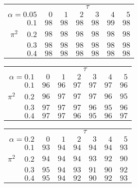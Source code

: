 \begin{tabular}{r|rrrrrr}
\hline\hline
 &\multicolumn{6}{c}{$\tau$} \\ 
 $\alpha = 0.05$ & $0$ & $1$ & $2$ & $3$ & $4$ & $5$ \\ 
 \hline$0.1$ & $98$ & $98$ & $98$ & $98$ & $99$ & $98$\\ 
$\pi^2\;\;\;$ $0.2$ & $98$ & $98$ & $98$ & $98$ & $98$ & $98$\\ 
$0.3$ & $98$ & $98$ & $98$ & $98$ & $98$ & $98$\\ 
$0.4$ & $98$ & $98$ & $98$ & $98$ & $98$ & $98$\\ 
 \hline 
 \end{tabular}
 
 \vspace{2em} 
 
\begin{tabular}{r|rrrrrr}
\hline\hline
 &\multicolumn{6}{c}{$\tau$} \\ 
 $\alpha = 0.1$ & $0$ & $1$ & $2$ & $3$ & $4$ & $5$ \\ 
 \hline$0.1$ & $96$ & $96$ & $97$ & $97$ & $97$ & $96$\\ 
$\pi^2\;\;\;$ $0.2$ & $96$ & $97$ & $97$ & $97$ & $96$ & $95$\\ 
$0.3$ & $97$ & $97$ & $97$ & $96$ & $95$ & $96$\\ 
$0.4$ & $97$ & $97$ & $96$ & $95$ & $96$ & $97$\\ 
 \hline 
 \end{tabular}
 
 \vspace{2em} 
 
\begin{tabular}{r|rrrrrr}
\hline\hline
 &\multicolumn{6}{c}{$\tau$} \\ 
 $\alpha = 0.2$ & $0$ & $1$ & $2$ & $3$ & $4$ & $5$ \\ 
 \hline$0.1$ & $93$ & $94$ & $94$ & $94$ & $94$ & $93$\\ 
$\pi^2\;\;\;$ $0.2$ & $94$ & $94$ & $94$ & $93$ & $92$ & $90$\\ 
$0.3$ & $95$ & $94$ & $93$ & $91$ & $90$ & $92$\\ 
$0.4$ & $95$ & $94$ & $92$ & $90$ & $92$ & $93$\\ 
 \hline 
 \end{tabular}